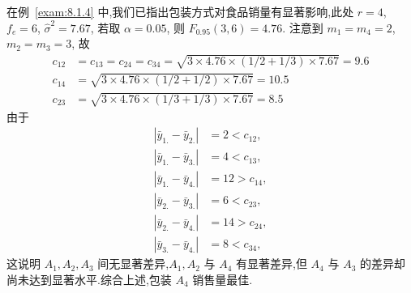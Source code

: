 \begin{example}\label{exam:8.2.3}
  在例~\ref{exam:8.1.4} 中,我们已指出包装方式对食品销量有显著影响,此处 $r=4$, $f_e = 6$, $\hat{\sigma}^2 = 7.67$, 若取 $\alpha = 0.05$, 则 $F_{0.95}(3,6) = 4.76$. 注意到 $m_1 = m_4 = 2$, $m_2=m_3=3$, 故
  \begin{align*}
    c_{12} &=c_{13}=c_{24}=c_{34}=\sqrt{3 \times 4.76 \times(1 / 2+1 / 3) \times 7.67}=9.6 \\
    c_{14} &=\sqrt{3 \times 4.76 \times(1 / 2+1 / 2) \times 7.67}=10.5 \\
    c_{23} &=\sqrt{3 \times 4.76 \times(1 / 3+1 / 3) \times 7.67}=8.5
  \end{align*}
  由于
  \begin{align*}
    \left|\bar{y}_{1.}-\bar{y}_{2.} \right| &=  2 < c_{12},\\
    \left|\bar{y}_{1.}-\bar{y}_{3.} \right| &=  4 < c_{13},\\
    \left|\bar{y}_{1.}-\bar{y}_{4.} \right| &= 12 > c_{14},\\
    \left|\bar{y}_{2.}-\bar{y}_{3.} \right| &=  6 < c_{23},\\
    \left|\bar{y}_{2.}-\bar{y}_{4.} \right| &= 14 > c_{24},\\
    \left|\bar{y}_{3.}-\bar{y}_{4.} \right| &=  8 < c_{34},
  \end{align*}
这说明 $A_1, A_2, A_3$ 间无显著差异,$A_1, A_2$ 与 $A_4$ 有显著差异,但 $A_4$ 与 $A_3$ 的差异却尚未达到显著水平.综合上述,包装 $A_4$ 销售量最佳.
\end{example}


